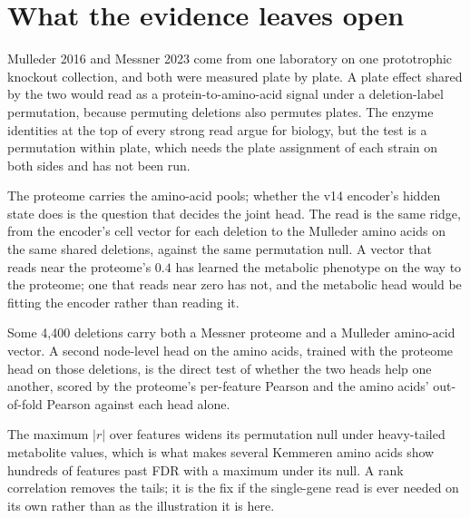 
\section{What the evidence leaves open}
\label{sec:next}

 Mulleder 2016 and Messner 2023 come from one laboratory
on one prototrophic knockout collection, and both were measured plate by plate. A
plate effect shared by the two would read as a protein-to-amino-acid signal under a
deletion-label permutation, because permuting deletions also permutes plates. The
enzyme identities at the top of every strong read argue for biology, but the test is a
permutation within plate, which needs the plate assignment of each strain on both sides
and has not been run.

 The proteome carries the amino-acid pools; whether
the v14 encoder's hidden state does is the question that decides the joint head. The
read is the same ridge, from the encoder's cell vector for each deletion to the
Mulleder amino acids on the same shared deletions, against the same permutation null.
A vector that reads near the proteome's $0.4$ has learned the metabolic phenotype on the
way to the proteome; one that reads near zero has not, and the metabolic head would be
fitting the encoder rather than reading it.

 Some 4{,}400 deletions carry both a
Messner proteome and a Mulleder amino-acid vector. A second node-level head on the
amino acids, trained with the proteome head on those deletions, is the direct test of
whether the two heads help one another, scored by the proteome's per-feature Pearson
and the amino acids' out-of-fold Pearson against each head alone.

 The maximum $|r|$ over features widens its
permutation null under heavy-tailed metabolite values, which is what makes several
Kemmeren amino acids show hundreds of features past FDR with a maximum under its null.
A rank correlation removes the tails; it is the fix if the single-gene read is ever
needed on its own rather than as the illustration it is here.
